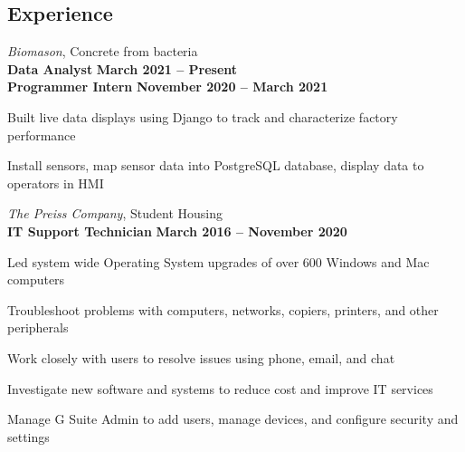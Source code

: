 \documentclass[margin,line]{resume}
\begin{document}
\begin{resume}
    \section{\mysidestyle Experience}


    \textsl{Biomason}, Concrete from bacteria\\
    \textbf{Data Analyst}  \hfill \textbf{March 2021 -- Present}\\
    \textbf{Programmer Intern}  \hfill \textbf{November 2020 -- March 2021}\\
    \vspace{-4mm}
    \begin{list2}
    \item Built live data displays using Django to track and characterize factory performance
    \item Install sensors, map sensor data into PostgreSQL database, display data to operators in HMI
    \end{list2}
    \vspace{3mm}


    \textsl{The Preiss Company}, Student Housing\\
    \textbf{IT Support Technician}  \hfill \textbf{March 2016 -- November 2020}\\
    \vspace{-4mm}
    \begin{list2}
    \item Led system wide Operating System upgrades of over 600 Windows and Mac computers
    \item Troubleshoot problems with computers, networks, copiers, printers, and other peripherals
    \item Work closely with users to resolve issues using phone, email, and chat
    \item Investigate new software and systems to reduce cost and improve IT services
    \item  Manage G Suite Admin to add users, manage devices, and configure security and settings
    \end{list2}
    \vspace{3mm}



\end{resume}
\end{document}
